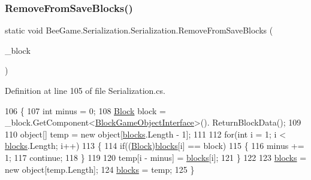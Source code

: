 \subsubsection{\texorpdfstring{Remove\+From\+Save\+Blocks()}{RemoveFromSaveBlocks()}}
{\footnotesize\ttfamily static void Bee\+Game.\+Serialization.\+Serialization.\+Remove\+From\+Save\+Blocks (\begin{DoxyParamCaption}\item[{Game\+Object}]{\+\_\+block }\end{DoxyParamCaption})\hspace{0.3cm}{\ttfamily [static]}}



Definition at line 105 of file Serialization.\+cs.


\begin{DoxyCode}
106         \{
107             \textcolor{keywordtype}{int} minus = 0;
108             \hyperlink{class_bee_game_1_1_blocks_1_1_block}{Block} block = \_block.GetComponent<\hyperlink{class_bee_game_1_1_blocks_1_1_block_game_object_interface}{BlockGameObjectInterface}>().
      ReturnBlockData();
109 
110             \textcolor{keywordtype}{object}[] temp = \textcolor{keyword}{new} \textcolor{keywordtype}{object}[\hyperlink{class_bee_game_1_1_serialization_1_1_serialization_a0b8dee0f221f22b34bb3de8c146b4d0d}{blocks}.Length - 1];
111 
112             \textcolor{keywordflow}{for}(\textcolor{keywordtype}{int} i = 1; i < \hyperlink{class_bee_game_1_1_serialization_1_1_serialization_a0b8dee0f221f22b34bb3de8c146b4d0d}{blocks}.Length; i++)
113             \{
114                 \textcolor{keywordflow}{if}((\hyperlink{class_bee_game_1_1_blocks_1_1_block}{Block})\hyperlink{class_bee_game_1_1_serialization_1_1_serialization_a0b8dee0f221f22b34bb3de8c146b4d0d}{blocks}[i] == block)
115                 \{
116                     minus += 1;
117                     \textcolor{keywordflow}{continue};
118                 \}
119 
120                 temp[i - minus] = \hyperlink{class_bee_game_1_1_serialization_1_1_serialization_a0b8dee0f221f22b34bb3de8c146b4d0d}{blocks}[i];
121             \}
122 
123             \hyperlink{class_bee_game_1_1_serialization_1_1_serialization_a0b8dee0f221f22b34bb3de8c146b4d0d}{blocks} = \textcolor{keyword}{new} \textcolor{keywordtype}{object}[temp.Length];
124             \hyperlink{class_bee_game_1_1_serialization_1_1_serialization_a0b8dee0f221f22b34bb3de8c146b4d0d}{blocks} = temp;
125         \}
\end{DoxyCode}
\mbox{\label{class_bee_game_1_1_serialization_1_1_serialization_ac1a39ee414803d84d970c1d6c03facbc}} 

